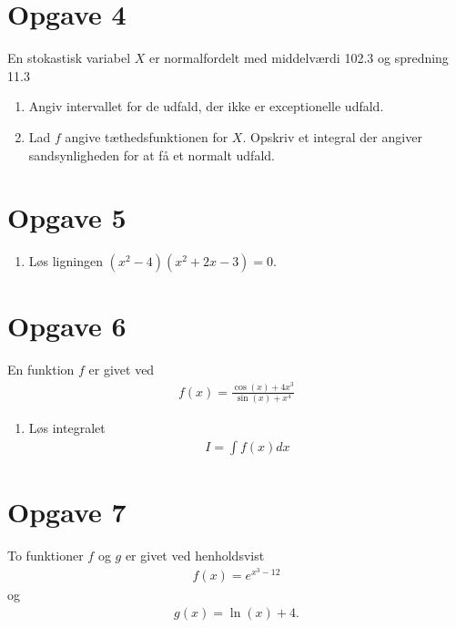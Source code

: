 \section*{Opgave 4}

En stokastisk variabel $X$ er normalfordelt med middelværdi 102.3 og spredning 11.3


\begin{enumerate}[label=\roman*)]
	\item	Angiv intervallet for de udfald, der ikke er exceptionelle udfald. 
	\item	Lad $f$ angive tæthedsfunktionen for $X$. Opskriv et integral der angiver sandsynligheden for at få et normalt udfald.
\end{enumerate}

\section*{Opgave 5}

\begin{enumerate}[label=\roman*)]
	\item Løs ligningen $(x^2-4)(x^2+2x-3)=0$.
\end{enumerate}

\section*{Opgave 6}

En funktion $f$ er givet ved
\begin{align*}
	f(x) = \frac{\cos(x)+4x^3}{\sin(x)+x^4}
\end{align*}
\begin{enumerate}[label=\roman*)]
	\item Løs integralet
	\begin{align*}
		I = \int f(x) dx
	\end{align*}
\end{enumerate}

\section*{Opgave 7}

To funktioner $f$ og $g$ er givet ved henholdsvist 
\begin{align*}
	f(x) = e^{x^3-12}
\end{align*}
og 
\begin{align*}
	g(x) = \ln(x)+4.
\end{align*}


